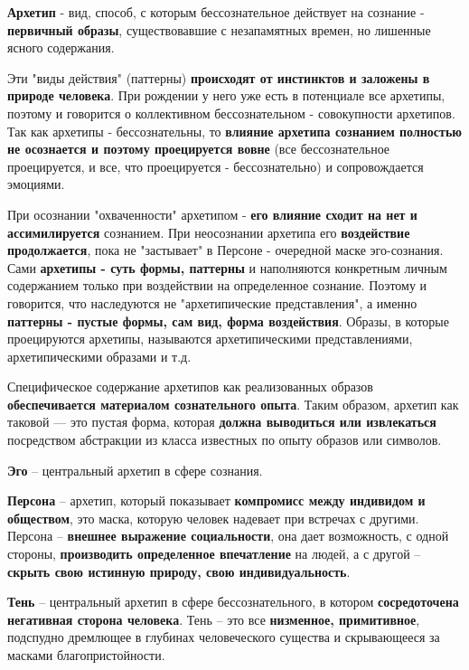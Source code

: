 \documentclass{article}
\begin{document}
\begin{flushleft}

\textbf{Архетип} - вид, способ, с которым бессознательное действует на сознание - \textbf{первичный образы}, существовавшие с незапамятных времен, но лишенные ясного содержания.

\hfill

Эти "виды действия" (паттерны) \textbf{происходят от инстинктов и заложены в природе человека}. При рождении у него уже есть в потенциале все архетипы, поэтому и говорится о коллективном бессознательном - совокупности архетипов. Так как архетипы - бессознательны, то \textbf{влияние архетипа сознанием полностью не осознается и поэтому проецируется вовне} (все бессознательное проецируется, и все, что проецируется - бессознательно) и сопровождается эмоциями.

\hfill

При осознании "охваченности" архетипом - \textbf{его влияние сходит на нет и ассимилируется} сознанием. При неосознании архетипа его \textbf{воздействие продолжается}, пока не "застывает" в Персоне - очередной маске эго-сознания. Сами \textbf{архетипы - суть формы, паттерны} и наполняются конкретным личным содержанием только при воздействии на определенное сознание. Поэтому и говорится, что наследуются не "архетипические представления", а именно \textbf{паттерны - пустые формы, сам вид, форма воздействия}. Образы, в которые проецируются архетипы, называются архетипическими представлениями, архетипическими образами и т.д.

\hfill

Специфическое содержание архетипов как реализованных образов \textbf{обеспечивается материалом сознательного опыта}. Таким образом, архетип как таковой — это пустая форма, которая \textbf{должна выводиться или извлекаться} посредством абстракции из класса известных по опыту образов или символов.

\hfill

\textbf{Эго} – центральный архетип в сфере сознания.

\textbf{Персона} – архетип, который показывает \textbf{компромисс между индивидом и обществом}, это маска, которую человек надевает при встречах с другими. Персона – \textbf{внешнее выражение социальности}, она дает возможность, с одной стороны, \textbf{производить определенное впечатление} на людей, а с другой – \textbf{скрыть свою истинную природу, свою индивидуальность}.

\textbf{Тень} – центральный архетип в сфере бессознательного, в котором \textbf{сосредоточена негативная сторона человека}. Тень – это все \textbf{низменное, примитивное}, подспудно дремлющее в глубинах человеческого существа и скрывающееся за масками благопристойности.


\end{flushleft}
\end{document}
